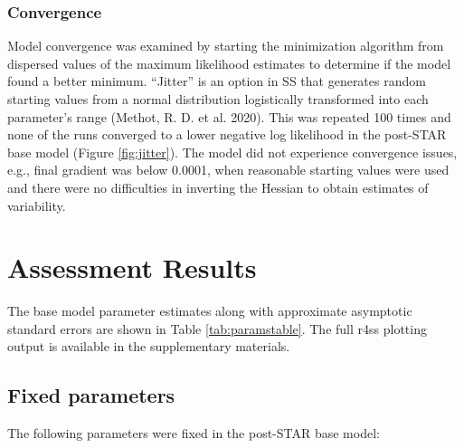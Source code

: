 \documentclass[11pt,
  english,
]{article}
\begin{document}

\hypertarget{convergence}{%
\subsubsection{Convergence}\label{convergence}}

\leavevmode\tagmcend\tagstructend

Model convergence was examined by starting the minimization algorithm from dispersed values of the maximum likelihood estimates to determine if the model found a better minimum. ``Jitter'' is an option in SS that generates random starting values from a normal distribution logistically transformed into each parameter's range {(Methot, R. D. et al. 2020)\leavevmode\tagmcend\tagstructend}. This was repeated 100 times and none of the runs converged to a lower negative log likelihood in the post-STAR base model (Figure \ref{fig:jitter}). The model did not experience convergence issues, e.g., final gradient was below 0.0001, when reasonable starting values were used and there were no difficulties in inverting the Hessian to obtain estimates of variability.


\hypertarget{assessment-results}{%
\section{Assessment Results}\label{assessment-results}}

\leavevmode\tagmcend\tagstructend

The base model parameter estimates along with approximate asymptotic standard errors are shown in Table \ref{tab:paramstable}. The full r4ss plotting output is available in the supplementary materials.


\hypertarget{fixed-parameters}{%
\subsection{Fixed parameters}\label{fixed-parameters}}

\leavevmode\tagmcend\tagstructend

The following parameters were fixed in the post-STAR base model:

\end{document}
